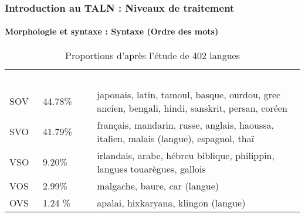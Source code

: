 \documentclass[xcolor=table]{beamer}
\begin{document}
\begin{frame}
\frametitle{Introduction au TALN : Niveaux de traitement}
\framesubtitle{Morphologie et syntaxe : Syntaxe (Ordre des mots)}

\begin{table}
	\begin{tabular}{p{}p{}p{}}
		\rowcolor{darkblue}
		\textcolor{white}{Ordre} & \textcolor{white}{Proportion} & \textcolor{white}{Exemples} \\
		SOV & 44.78\% & japonais, latin, tamoul, basque, ourdou, grec ancien, bengali, hindi, sanskrit, persan, coréen \\
		SVO & 41.79\% & français, mandarin, russe, anglais, haoussa, italien, malais (langue), espagnol, thaï \\
		VSO & 9.20\% & irlandais, arabe, hébreu biblique, philippin, langues touarègues, gallois \\
		VOS & 2.99\% & malgache, baure, car (langue) \\
		OVS & 1.24 \% & apalai, hixkaryana, klingon (langue) \\
	\end{tabular}
	\caption{Proportions d'après l'étude de 402 langues \cite{1988-blake}}
\end{table}

\end{frame}
\end{document}
